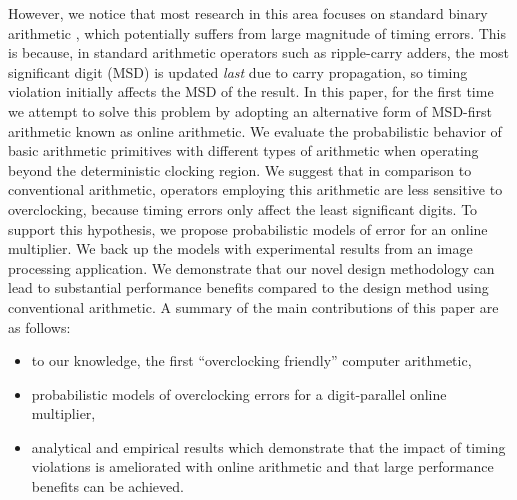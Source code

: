 \documentclass{acm_proc_article-sp}
\begin{document}
However, we notice that most research in this area focuses on standard binary arithmetic \cite{Gupta2013TransCADICS,NonUniformScaling,Undersigned2x2multiplier}, which potentially suffers from large magnitude of timing errors. This is because, in standard arithmetic operators such as ripple-carry adders, the most significant digit (MSD) is updated \emph{last} due to carry propagation, so timing violation initially affects the MSD of the result. In this paper, for the first time we attempt to solve this problem by adopting an alternative form of MSD-first arithmetic known as online arithmetic. We evaluate the probabilistic behavior of basic arithmetic primitives with different types of arithmetic when operating beyond the deterministic clocking region. We suggest that in comparison to conventional arithmetic, operators employing this arithmetic are less sensitive to overclocking, because timing errors only affect the least significant digits. To support this hypothesis, we propose probabilistic models of error for an online multiplier. We back up the models with experimental results from an image processing application. We demonstrate that our novel design methodology can lead to substantial performance benefits compared to the design method using conventional arithmetic. A summary of the main contributions of this paper are as follows:
%
\begin{itemize}
\vspace{-2ex}
  \item to our knowledge, the first ``overclocking friendly'' computer arithmetic,\vspace{-.7ex}
  \item probabilistic models of overclocking errors for a digit-parallel online multiplier,\vspace{-.7ex}
  \item analytical and empirical results which demonstrate that the impact of timing violations is ameliorated with online arithmetic and that large performance benefits can be achieved.\vspace{-.7ex}
\end{itemize}



\end{document}
